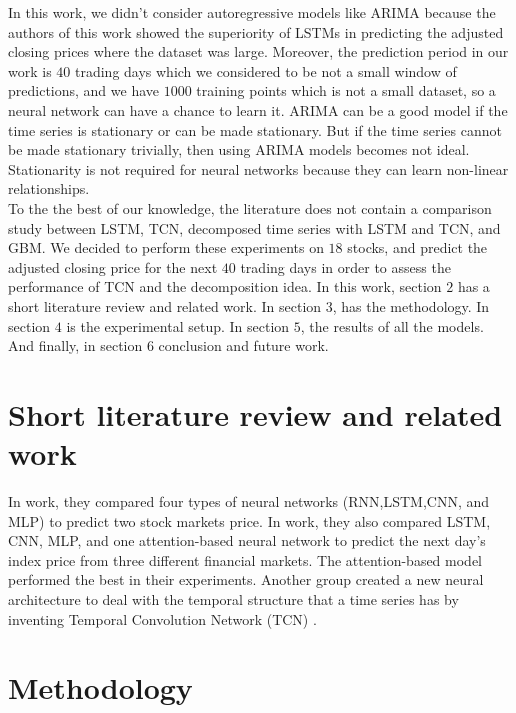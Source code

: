 \documentclass[12pt, A4]{article}
\begin{document}
In this work, we didn't consider autoregressive models like ARIMA because the authors of this work \cite{siami2018comparison} showed the superiority of LSTMs in predicting the adjusted closing prices where the dataset was large. Moreover, the prediction period in our work is $40$ trading days which we considered to be not a small window of predictions, and we have $1000$ training points which is not a small dataset, so a neural network can have a chance to learn it. ARIMA can be a good model if the time series is stationary or can be made stationary. But if the time series cannot be made stationary trivially, then using ARIMA models becomes not ideal. Stationarity is not required for neural networks because they can learn non-linear relationships. \\

To the the best of our knowledge, the literature does not contain a comparison study between LSTM, TCN, decomposed time series with LSTM and TCN, and GBM. We decided to perform these experiments on $18$ stocks, and predict the adjusted closing price for the next $40$ trading days in order to assess the performance of TCN and the decomposition idea. In this work, section $2$ has a short literature review and related work. In section $3$, has the methodology. In section $4$ is the experimental setup. In section $5$, the results of all the models. And finally, in section $6$ conclusion and future work.

\section{Short literature review and related work}

In \cite{hiransha2018nse} work, they compared four types of neural networks (RNN,LSTM,CNN, and MLP) to predict two stock markets price. In \cite{gao2020application} work, they also compared LSTM, CNN, MLP, and one attention-based neural network to predict the next day's index price from three different financial markets. The attention-based model performed the best in their experiments. Another group created a new neural architecture to deal with the temporal structure that a time series has by inventing Temporal Convolution Network (TCN)  \cite{lea2017temporal}. 
\section{Methodology}
\end{document}
